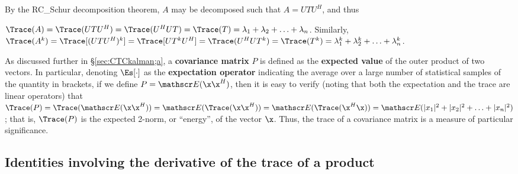 \noindent By the RC_Schur decomposition theorem, $A$ may be decomposed
such that $A=UTU^{H}$, and thus

\begin{fact} \label{fact.A.F.A.b}
$\Trace(A)=\Trace(UTU^{H})=\Trace(U^{H}UT)=\Trace(T)=\lambda_{1}+\lambda_{2}+\ldots+\lambda_{n}$.  \hfill\break
Similarly,
$\Trace(A^k)=\Trace[(UTU^{H})^k]=\Trace[UT^kU^{H}]=\Trace(U^{H}UT^k)=\Trace(T^k)=\lambda_{1}^k+\lambda_{2}^k+\ldots+\lambda_{n}^k$.
\end{fact}

As discussed further in \S \ref{sec:CTCkalman;a}, a {\bf covariance matrix} $P$ is
defined as the {\bf expected value} of the outer product of two vectors. 
In particular, denoting $\Es[\cdot]$ as the {\bf expectation operator} indicating the average over a
large number of statistical samples of the quantity in brackets, if we define
$P={\mathscr E}(\x \x^{H})$, then it is easy to verify (noting that both the expectation and the trace are linear operators) that
$\Trace(P)=\Trace({\mathscr E}(\x \x^{H}))={\mathscr E}(\Trace(\x \x^{H}))={\mathscr E}(\Trace(\x^{H}\x))={\mathscr E}(|x_{1}|^{2}+|x_{2}|^{2}+\ldots+|x_{n}|^{2})$; 
that is, $\Trace(P)$ is the expected 2-norm, or ``energy'', of the vector $\x$.  Thus, the trace of a covariance matrix is a measure of particular significance.

\subsection{Identities involving the derivative of the trace of a product}

